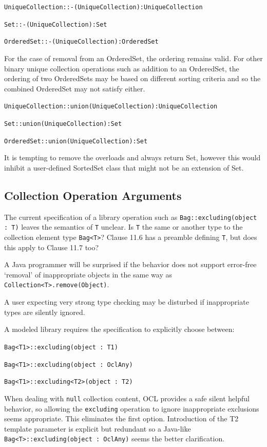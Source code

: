 \documentclass{eceasst}
\begin{document}
\verb|UniqueCollection::-(UniqueCollection):UniqueCollection| 

\verb|Set::-(UniqueCollection):Set|

\verb|OrderedSet::-(UniqueCollection):OrderedSet|

For the case of removal from an OrderedSet, the ordering remains valid. For other binary unique collection operations such as addition to an OrderedSet, the ordering of two OrderedSets may be based on different sorting criteria and so the combined OrderedSet may not satisfy either.

\verb|UniqueCollection::union(UniqueCollection):UniqueCollection| 

\verb|Set::union(UniqueCollection):Set| 

\verb|OrderedSet::union(UniqueCollection):Set| 

It is tempting to remove the overloads and always return Set, however this would inhibit a user-defined SortedSet class that might not be an extension of Set.  

\subsection{Collection Operation Arguments}

The current specification of a library operation such as \verb|Bag::excluding(object : T)| leaves the semantics of \verb|T| unclear. Is \verb|T| the same or another type to the collection element type \verb|Bag<T>|? Clause 11.6 has a preamble defining \verb|T|, but does this apply to Clause 11.7 too?

A Java programmer will be surprised if the behavior does not support error-free `removal' of inappropriate objects in the same way as \verb|Collection<T>.remove(Object)|.

A user expecting very strong type checking may be disturbed if inappropriate types are silently ignored.

A modeled library requires the specification to explicitly choose between:

\verb|Bag<T1>::excluding(object : T1)|

\verb|Bag<T1>::excluding(object : OclAny)|

\verb|Bag<T1>::excluding<T2>(object : T2)|

When dealing with \verb|null| collection content, OCL provides a safe silent helpful behavior, so allowing the \verb|excluding| operation to ignore inappropriate exclusions seems appropriate. This eliminates the first option. Introduction of the T2 template parameter is explicit but redundant so a Java-like \verb|Bag<T>::excluding(object : OclAny)| seems the better clarification.
\end{document}

